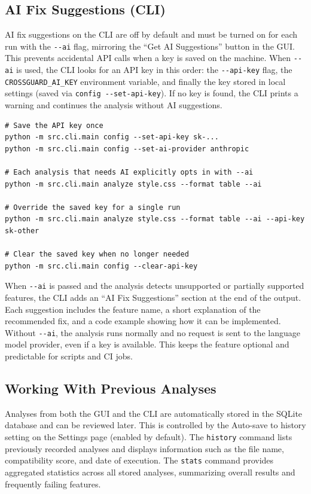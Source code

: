 \subsection{AI Fix Suggestions (CLI)}

AI fix suggestions on the CLI are off by default and must be turned on for each run with the \texttt{-{}-ai} flag, mirroring the ``Get AI Suggestions'' button in the GUI. This prevents accidental API calls when a key is saved on the machine. When \texttt{-{}-ai} is used, the CLI looks for an API key in this order: the \texttt{-{}-api-key} flag, the \texttt{CROSSGUARD\_AI\_KEY} environment variable, and finally the key stored in local settings (saved via \texttt{config -{}-set-api-key}). If no key is found, the CLI prints a warning and continues the analysis without AI suggestions.

\begin{lstlisting}[caption={Enable AI fix suggestions per run with \texttt{-{}-ai}}, label=src:ai-cli, basicstyle=\ttfamily\small, breaklines=true]
# Save the API key once 
python -m src.cli.main config --set-api-key sk-...
python -m src.cli.main config --set-ai-provider anthropic

# Each analysis that needs AI explicitly opts in with --ai
python -m src.cli.main analyze style.css --format table --ai

# Override the saved key for a single run
python -m src.cli.main analyze style.css --format table --ai --api-key sk-other

# Clear the saved key when no longer needed
python -m src.cli.main config --clear-api-key
\end{lstlisting}

When \texttt{-{}-ai} is passed and the analysis detects unsupported or partially supported features, the CLI adds an ``AI Fix Suggestions'' section at the end of the output. Each suggestion includes the feature name, a short explanation of the recommended fix, and a code example showing how it can be implemented. Without \texttt{-{}-ai}, the analysis runs normally and no request is sent to the language model provider, even if a key is available. This keeps the feature optional and predictable for scripts and CI jobs.
\newpage


\subsection{Working With Previous Analyses}

Analyses from both the GUI and the CLI are automatically stored in the SQLite database and can be reviewed later. This is controlled by the {Auto-save to history} setting on the Settings page (enabled by default). The \texttt{history} command lists previously recorded analyses and displays information such as the file name, compatibility score, and date of execution. The \texttt{stats} command provides aggregated statistics across all stored analyses, summarizing overall results and frequently failing features.


